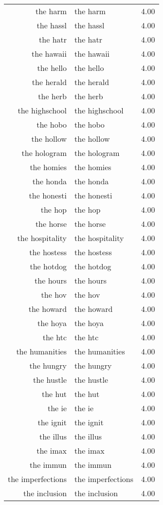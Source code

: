 \begin{table}[ht]
\begin{tabular}{rlr}
  the harm & the harm & 4.00 \\ 
  the hassl & the hassl & 4.00 \\ 
  the hatr & the hatr & 4.00 \\ 
  the hawaii & the hawaii & 4.00 \\ 
  the hello & the hello & 4.00 \\ 
  the herald & the herald & 4.00 \\ 
  the herb & the herb & 4.00 \\ 
  the highschool & the highschool & 4.00 \\ 
  the hobo & the hobo & 4.00 \\ 
  the hollow & the hollow & 4.00 \\ 
  the hologram & the hologram & 4.00 \\ 
  the homies & the homies & 4.00 \\ 
  the honda & the honda & 4.00 \\ 
  the honesti & the honesti & 4.00 \\ 
  the hop & the hop & 4.00 \\ 
  the horse & the horse & 4.00 \\ 
  the hospitality & the hospitality & 4.00 \\ 
  the hostess & the hostess & 4.00 \\ 
  the hotdog & the hotdog & 4.00 \\ 
  the hours & the hours & 4.00 \\ 
  the hov & the hov & 4.00 \\ 
  the howard & the howard & 4.00 \\ 
  the hoya & the hoya & 4.00 \\ 
  the htc & the htc & 4.00 \\ 
  the humanities & the humanities & 4.00 \\ 
  the hungry & the hungry & 4.00 \\ 
  the hustle & the hustle & 4.00 \\ 
  the hut & the hut & 4.00 \\ 
  the ie & the ie & 4.00 \\ 
  the ignit & the ignit & 4.00 \\ 
  the illus & the illus & 4.00 \\ 
  the imax & the imax & 4.00 \\ 
  the immun & the immun & 4.00 \\ 
  the imperfections & the imperfections & 4.00 \\ 
  the inclusion & the inclusion & 4.00 \\ 

\end{tabular}
\end{table}
